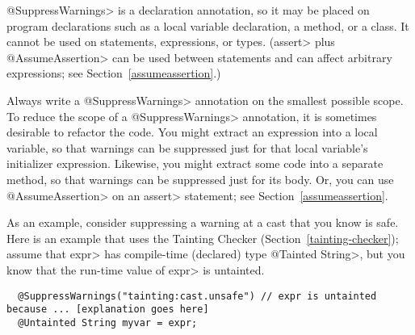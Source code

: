 %



\<@SuppressWarnings> is a declaration annotation, so it may be placed on
program declarations such as a local variable declaration, a method, or a
class.  It cannot be used on statements, expressions, or types.
(\<assert> plus \<@AssumeAssertion> can be used between statements and can
affect arbitrary expressions; see Section~\ref{assumeassertion}.)

Always write a \<@SuppressWarnings> annotation on the smallest possible
scope.  To reduce the scope of a \<@SuppressWarnings> annotation, it is
sometimes desirable to refactor the code.  You might extract an expression
into a local variable, so that warnings can be suppressed just for that
local variable's initializer expression.  Likewise, you might extract some
code into a separate method, so that warnings can be suppressed just for
its body.  Or, you can use \<@AssumeAssertion> on an \<assert> statement;
see Section~\ref{assumeassertion}.

As an example, consider suppressing a warning at a cast that you know is
safe.  Here is an example that uses the Tainting Checker
(Section~\ref{tainting-checker}); assume that \<expr> has compile-time
(declared) type \<@Tainted String>, but you know that the run-time value of
\<expr> is untainted.

\begin{smaller}
\begin{Verbatim}
  @SuppressWarnings("tainting:cast.unsafe") // expr is untainted because ... [explanation goes here]
  @Untainted String myvar = expr;
\end{Verbatim}
\end{smaller}

